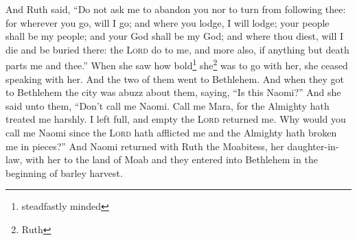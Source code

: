 \begin{enumerate*}[mode=unboxed]
     And Ruth said, ``Do not ask me to abandon you nor to turn from following thee: for wherever you go, will I go; and where you lodge, I will lodge; your people shall be my people; and your God shall be my God;%
     and where thou diest, will I die and be buried there: the \textsc{Lord} do to me, and more also, if anything but death parts me and thee.''%
     When she saw how bold\footnote{steadfastly minded} she\footnote{Ruth} was to go with her, she ceased speaking with her.%
     And the two of them went to Bethlehem. And when they got to Bethlehem the city was abuzz about them, saying, ``Is this Naomi?''%
     And she said unto them, ``Don't call me Naomi. Call me Mara, for the Almighty hath treated me harshly.%
     I left full, and empty the \textsc{Lord} returned me. Why would you call me Naomi since the \textsc{Lord} hath afflicted me and the Almighty hath broken me in pieces?''%
     And Naomi returned with Ruth the Moabitess, her daughter-in-law, with her to the land of Moab and they entered into Bethlehem in the beginning of barley harvest.%
\end{enumerate*}
